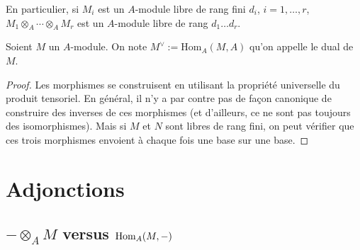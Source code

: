 En particulier, si $M_i$ est un $A$-module  libre  de rang fini $d_i$, $i=1,\dots, r$, $M_1\otimes_{A}\cdots\otimes_{A}M_r$ est un $A$-module libre de rang $d_1\dots d_r$.

\begin{definition}
  Soient $M$ un $A$-module. On note $M^\vee:=\mathrm{Hom}_A(M,A)$ qu'on appelle le dual de $M$.
\end{definition}
 

\begin{proof}Les morphismes se construisent en utilisant la propriété universelle du produit tensoriel. En général, il n'y a par contre pas de façon canonique de construire des inverses de ces morphismes (et d'ailleurs, ce ne sont pas toujours des isomorphismes). Mais si  $M$ et $N$ sont libres de rang fini, on peut vérifier que ces trois morphismes envoient à chaque fois une base sur une base. \end{proof}
\section{Adjonctions}


\subsection{$-\otimes_A M$ versus $\operatorname{Hom}_A(M,-)$}


